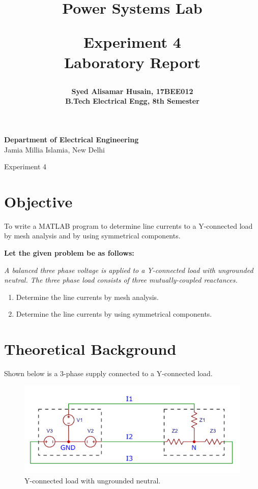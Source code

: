 \documentclass[a4paper,12pt]{article}
\title{
  {\Huge \bf Power Systems Lab}\\
  \vspace{0.25in}

  {\bf Experiment 4}\\
  Laboratory Report
  \vspace{1in}
}
\author{
  \bf Syed Alisamar Husain, 17BEE012\\
  B.Tech Electrical Engg, 8th Semester
}
\begin{document}
  \begin{titlepage}
    \maketitle
    \vspace*{\fill}
    \begin{center}
      {\bfseries Department of Electrical Engineering} \\
      Jamia Millia Islamia, New Delhi
    \end{center}
    \thispagestyle{empty}
  \end{titlepage}
  
  \newpage
  \begin{center}
    \huge Experiment 4
    \vspace{0.5in}
  \end{center}

  \section{Objective}
  To write a MATLAB program to determine line currents to a Y-connected load
  by mesh analysis and by using symmetrical components.

  {\bf Let the given problem be as follows:}
  \begin{center}
    \itshape
    A balanced three phase voltage is applied to a Y-connected load with ungrounded 
    neutral. The three phase load consists of three mutually-coupled reactances.
  \end{center}
  \begin{enumerate}
    \itshape
    \item Determine the line currents by mesh analysis.    
    \item Determine the line currents by using symmetrical components.
  \end{enumerate}

  \section{Theoretical Background}
  Shown below is a 3-phase supply connected to a Y-connected load.
  \begin{figure}[H]
    \centering
    \includegraphics[width=5in]{img/y-load.png}
    \caption{Y-connected load with ungrounded neutral.}
    \label{yload}
  \end{figure}
\end{document}

